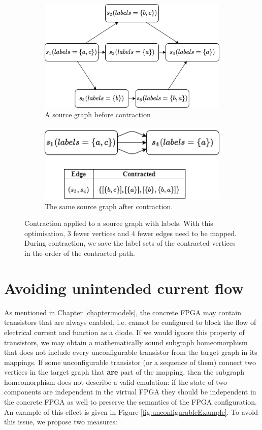 \begin{figure}
\begin{subfigure}{.55\textwidth}
  \centering
\includegraphics[scale=0.5]{images/contraction/after2.png}
  \caption{A source graph before contraction}
\end{subfigure}
\begin{subfigure}{.45\textwidth}
  \centering
\includegraphics[scale=0.6]{images/contraction/before2.png}
  \caption{The same source graph after contraction.}
\end{subfigure}
\caption{Contraction applied to a source graph with labels. With this optimisation, 3 fewer vertices and 4 fewer edges need to be mapped. During contraction, we save the label sets of the contracted vertices in the order of the contracted path.}
\label{fig:contraction}
\end{figure}





\section{Avoiding unintended current flow}
\label{sec:unintendedcurrent}
As mentioned in Chapter \ref{chapter:models}, the concrete FPGA may contain transistors that are always enabled, i.e. cannot be configured to block the flow of electrical current and function as a diode. If we would ignore this property of transistors, we may obtain a mathematically sound subgraph homeomorphism that does not include every unconfigurable transistor from the target graph in its mappings. If some unconfigurable transistor (or a sequence of them) connect two vertices in the target graph that \textbf{are} part of the mapping, then the subgraph homeomorphism does not describe a valid emulation: if the state of two components are independent in the virtual FPGA they should be independent in the concrete FPGA as well to preserve the semantics of the FPGA configuration. An example of this effect is given in Figure \ref{fig:unconfigurableExample}. To avoid this issue, we propose two measures:


